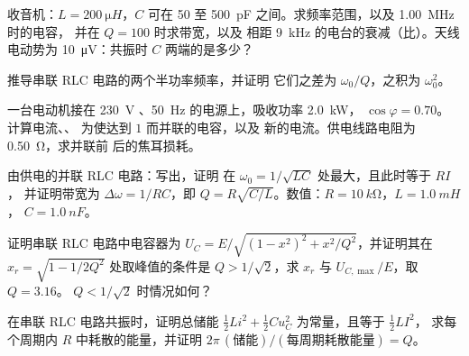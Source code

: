 \begin{exercise}[$\star\star$]\label{exo:b1:sinusoidal-impedance:7}
收音机：$L = \qty{200}{\micro H}$，$C$ 可在 \qty{50}{} 至
\qty{500}{pF} 之间。求频率范围，以及 \qty{1.00}{MHz} 时的电容，
并在 $Q = 100$ 时求带宽，以及
相距 \qty{9}{kHz} 的电台的衰减（比）。天线电动势为
\qty{10}{\micro V}：共振时 $C$ 两端的是多少？
\end{exercise}

\begin{exercise}[$\star\star$]\label{exo:b1:sinusoidal-impedance:8}
推导串联 RLC 电路的两个半功率频率，并证明
它们之差为 $\omega_0/Q$，之积为 $\omega_0^2$。
\end{exercise}

\begin{exercise}[$\star\star$]\label{exo:b1:sinusoidal-impedance:9}
一台电动机接在 \qty{230}{V} 、\qty{50}{Hz} 的电源上，吸收功率 \qty{2.0}{kW}，
$\cos\varphi = 0.70$。计算电流、、
为使达到 $1$ 而并联的电容，以及
新的电流。供电线路电阻为 \qty{0.50}{\ohm}，求并联前
后的焦耳损耗。
\end{exercise}

\begin{exercise}[$\star\star\star$]\label{exo:b1:sinusoidal-impedance:10}
由供电的并联 RLC 电路：写出，证明
在 $\omega_0 = 1/\sqrt{LC}$ 处最大，且此时等于 $RI$，
并证明带宽为 $\Delta\omega = 1/RC$，即 $Q =
R\sqrt{C/L}$。数值：$R = \qty{10}{k\ohm}$，$L = \qty{1.0}{mH}$，
$C = \qty{1.0}{nF}$。
\end{exercise}

\begin{exercise}[$\star\star\star$]\label{exo:b1:sinusoidal-impedance:11}
证明串联 RLC 电路中电容器为 $U_C = E/\sqrt{(1 -
x^2)^2 + x^2/Q^2}$，并证明其在 $x_r = \sqrt{1 - 1/2Q^2}$ 处取峰值的条件是
$Q > 1/\sqrt2$，求 $x_r$ 与 $U_{C,\max}/E$，取 $Q = 3.16$。
$Q < 1/\sqrt2$ 时情况如何？
\end{exercise}

\begin{exercise}[$\star\star\star$]\label{exo:b1:sinusoidal-impedance:12}
在串联 RLC 电路共振时，证明总储能
$\tfrac12 Li^2 + \tfrac12 Cu_C^2$ 为常量，且等于 $\tfrac12 LI^2$，
求每个周期内 $R$ 中耗散的能量，并证明
$2\pi\,(\text{储能})/(\text{每周期耗散能量}) = Q$。
\end{exercise}

